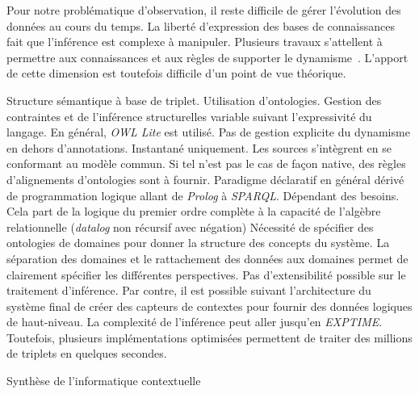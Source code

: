 Pour notre problématique d'observation, il reste difficile de gérer l'évolution des données au cours du temps. La liberté d'expression des bases de connaissances fait que l'inférence est complexe à manipuler. Plusieurs travaux s’attellent à permettre aux connaissances et aux règles de supporter le dynamisme~\cite{Weikum:webknowledge, Hellerstein:declarative}. L'apport de cette dimension est toutefois difficile d'un point de vue théorique.

\begin{table}[!ht]
\criteretabDonnee
    {Structure sémantique à base de triplet.}
    {Utilisation d'ontologies. Gestion des contraintes et de l'inférence structurelles variable suivant l'expressivité du langage. En général, \textit{OWL Lite} est utilisé.}
    {Pas de gestion explicite du dynamisme en dehors d'annotations.}
\criteretabTraitement
    {Instantané uniquement.}
    {Les sources s'intègrent en se conformant au modèle commun. Si tel n'est pas le cas de façon native, des règles d'alignements d'ontologies sont à fournir.}
    {Paradigme déclaratif en général dérivé de programmation logique allant de \textit{Prolog} à \textit{SPARQL}.}
    {Dépendant des besoins. Cela part de la logique du premier ordre complète à la capacité de l'algèbre relationnelle (\textit{datalog} non récursif avec négation)}
\criteretabAdaptabilite
    {Nécessité de spécifier des ontologies de domaines pour donner la structure des concepts du système.}
    {La séparation des domaines et le rattachement des données aux domaines permet de clairement spécifier les différentes perspectives.}
    {Pas d'extensibilité possible sur le traitement d'inférence. Par contre, il est possible suivant l'architecture du système final de créer des capteurs de contextes pour fournir des données logiques de haut-niveau.}
    {La complexité de l'inférence peut aller jusqu'en \textit{EXPTIME}. Toutefois, plusieurs implémentations optimisées permettent de traiter des millions de triplets en quelques secondes.}
\caption{Synthèse de l'informatique contextuelle}\label{tab:rw:supervision:contexte:synthese}
\end{table}
